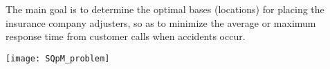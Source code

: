 The main goal is to
determine the optimal bases (locations) 
for placing the insurance company adjusters, 
so as to minimize
the average or maximum response time
from customer calls
when accidents occur.
\begin{center}
  \texttt{[image: SQpM\_problem]}
\end{center}
